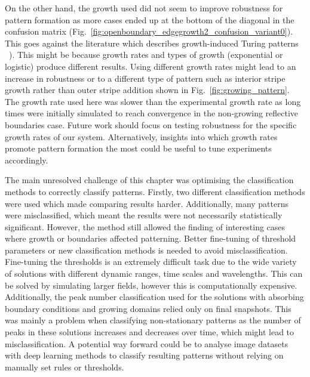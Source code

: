 On the other hand, the growth used did not seem to improve robustness for pattern formation as more cases ended up at the bottom of the diagonal in the confusion matrix (Fig.~\ref{fig:openboundary_edgegrowth2_confusion_variant0}).
This goes against the literature which describes growth-induced Turing patterns ~\parencite{gaffney2010}).
This might be because growth rates and types of growth (exponential or logistic) produce different results.
Using different growth rates might lead to an increase in robustness or to a different type of pattern such as interior stripe growth rather than outer stripe addition shown in Fig.~\ref{fig:growing_pattern}.
The growth rate used here was slower than the experimental growth rate as long times were initially simulated to reach convergence in the non-growing reflective boundaries case.
Future work should focus on testing robustness for the specific growth rates of our system.
Alternatively, insights into which growth rates promote pattern formation the most could be useful to tune experiments accordingly.

The main unresolved challenge of this chapter was optimising the classification methods to correctly classify patterns.
Firstly, two different classification methods were used which made comparing results harder.
Additionally, many patterns were misclassified, which meant the results were not necessarily statistically significant.
However, the method still allowed the finding of interesting cases where growth or boundaries affected patterning.
Better fine-tuning of threshold parameters or new classification methods is needed to avoid misclassification.
Fine-tuning the thresholds is an extremely difficult task due to the wide variety of solutions with different dynamic ranges, time scales and wavelengths.
This can be solved by simulating larger fields, however this is computationally expensive.
Additionally, the peak number classification used for the solutions with absorbing boundary conditions and growing domains relied only on final snapshots.
This was mainly a problem when classifying non-stationary patterns as the number of peaks in these solutions increases and decreases over time, which might lead to misclassification.
A potential way forward could be to analyse image datasets with deep learning methods to classify resulting patterns without relying on manually set rules or thresholds.